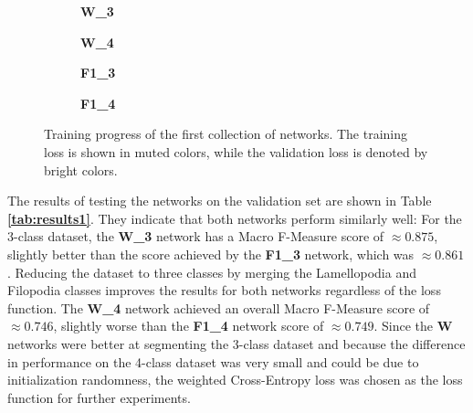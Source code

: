 \begin {figure}[!htb]
	\begin {subfigure}[b]{0.4\linewidth}
		\scalebox{0.65}{}
		\caption{\textbf{W\_3}}
	\end {subfigure}\hspace{1.75cm}
	\begin {subfigure}[b]{0.4\linewidth}
		\scalebox{0.65}{}
		\caption{\textbf{W\_4}}
	\end {subfigure}

	\begin {subfigure}[b]{0.4\linewidth}
		\scalebox{0.65}{}
		\caption{\textbf{F1\_3}}
	\end {subfigure}\hspace{1.75cm}
	\begin {subfigure}[b]{0.4\linewidth}
		\scalebox{0.65}{}
		\caption{\textbf{F1\_4}}
	\end {subfigure}

		\caption[Training progress of the first collection of networks.]{Training progress of the first collection of networks. The training loss is shown in muted colors, while the validation loss is denoted by bright colors.}
		\label{fig:weighted_f1_training}
\end {figure}

\noindent The results of testing the networks on the validation set are shown in Table \textbf{\ref{tab:results1}}. They indicate that both networks perform similarly well: For the 3-class dataset, the \textbf{W\_3} network has a Macro F-Measure score of $\approx0.875$, slightly better than the score achieved by the \textbf{F1\_3} network, which was $\approx0.861$. Reducing the dataset to three classes by merging the Lamellopodia and Filopodia classes improves the results for both networks regardless of the loss function. The \textbf{W\_4} network achieved an overall Macro F-Measure score of $\approx0.746$, slightly worse than the \textbf{F1\_4} network score of $\approx0.749$. Since the \textbf{W} networks were better at segmenting the 3-class dataset and because the difference in performance on the 4-class dataset was very small and could be due to initialization randomness, the weighted Cross-Entropy loss was chosen as the loss function for further experiments.\\


